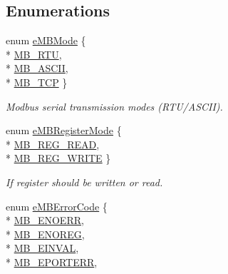 \subsection*{Enumerations}
\begin{DoxyCompactItemize}
\item 
enum \hyperlink{group__modbus_ga462d0d9396f02be6f9fd5b6f19463e61}{e\+M\+B\+Mode} \{ \\*
\hyperlink{group__modbus_gga462d0d9396f02be6f9fd5b6f19463e61a1b807b8cf3d593d8cd8d1a1d21a3da31}{M\+B\+\_\+\+R\+TU}, 
\\*
\hyperlink{group__modbus_gga462d0d9396f02be6f9fd5b6f19463e61afa37751530d5e48cb5a3f8841f9e3143}{M\+B\+\_\+\+A\+S\+C\+II}, 
\\*
\hyperlink{group__modbus_gga462d0d9396f02be6f9fd5b6f19463e61a5786284fe284b4a23889bf5b444d5142}{M\+B\+\_\+\+T\+CP}
 \}\begin{DoxyCompactList}\small\item\em Modbus serial transmission modes (R\+T\+U/\+A\+S\+C\+II). \end{DoxyCompactList}
\item 
enum \hyperlink{group__modbus_gaf1398cbbeb317b1dbd0276b275f5b0f8}{e\+M\+B\+Register\+Mode} \{ \\*
\hyperlink{group__modbus_ggaf1398cbbeb317b1dbd0276b275f5b0f8aa210c1d03e2745efb42486b822740d4b}{M\+B\+\_\+\+R\+E\+G\+\_\+\+R\+E\+AD}, 
\\*
\hyperlink{group__modbus_ggaf1398cbbeb317b1dbd0276b275f5b0f8a3d0a62208562b69c5e7692a5a168c14e}{M\+B\+\_\+\+R\+E\+G\+\_\+\+W\+R\+I\+TE}
 \}\begin{DoxyCompactList}\small\item\em If register should be written or read. \end{DoxyCompactList}
\item 
enum \hyperlink{group__modbus_ga9e7fce8c431cb0e521c67f7f36dd823d}{e\+M\+B\+Error\+Code} \{ \\*
\hyperlink{group__modbus_gga9e7fce8c431cb0e521c67f7f36dd823dabf4c1fb8c72eafc08be972225613fe2b}{M\+B\+\_\+\+E\+N\+O\+E\+RR}, 
\\*
\hyperlink{group__modbus_gga9e7fce8c431cb0e521c67f7f36dd823daf415371aad180c545b726d39adbf9ba7}{M\+B\+\_\+\+E\+N\+O\+R\+EG}, 
\\*
\hyperlink{group__modbus_gga9e7fce8c431cb0e521c67f7f36dd823dafa57cdb3f85e8ab4baf160579104d624}{M\+B\+\_\+\+E\+I\+N\+V\+AL}, 
\\*
\hyperlink{group__modbus_gga9e7fce8c431cb0e521c67f7f36dd823da539fb138411468b12c05556157c6864d}{M\+B\+\_\+\+E\+P\+O\+R\+T\+E\+RR}, 

\end{DoxyCompactItemize}
